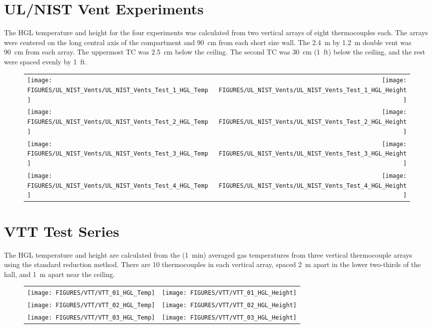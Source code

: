 \clearpage

\section{UL/NIST Vent Experiments}

The HGL temperature and height for the four experiments was calculated from two vertical arrays of eight thermocouples each. The arrays were centered on the long central axis of the compartment and 90~cm from each short size wall. The 2.4~m by 1.2~m double vent was 90~cm from each array. The uppermost TC was 2.5~cm below the ceiling. The second TC was 30~cm (1~ft) below the ceiling, and the rest were spaced evenly by 1~ft. 

\newpage

\begin{figure}[p]
\begin{tabular*}{\textwidth}{l@{\extracolsep{\fill}}r}
\texttt{[image: FIGURES/UL\_NIST\_Vents/UL\_NIST\_Vents\_Test\_1\_HGL\_Temp]} &
\texttt{[image: FIGURES/UL\_NIST\_Vents/UL\_NIST\_Vents\_Test\_1\_HGL\_Height]} \\
\texttt{[image: FIGURES/UL\_NIST\_Vents/UL\_NIST\_Vents\_Test\_2\_HGL\_Temp]} &
\texttt{[image: FIGURES/UL\_NIST\_Vents/UL\_NIST\_Vents\_Test\_2\_HGL\_Height]} \\
\texttt{[image: FIGURES/UL\_NIST\_Vents/UL\_NIST\_Vents\_Test\_3\_HGL\_Temp]} &
\texttt{[image: FIGURES/UL\_NIST\_Vents/UL\_NIST\_Vents\_Test\_3\_HGL\_Height]} \\
\texttt{[image: FIGURES/UL\_NIST\_Vents/UL\_NIST\_Vents\_Test\_4\_HGL\_Temp]} &
\texttt{[image: FIGURES/UL\_NIST\_Vents/UL\_NIST\_Vents\_Test\_4\_HGL\_Height]} 
\end{tabular*}
\end{figure}

\clearpage

\section{VTT Test Series}

The HGL temperature and height are calculated from the (1~min) averaged gas temperatures from three vertical thermocouple arrays using the standard reduction method. There are 10 thermocouples in each vertical array, spaced 2~m apart in the lower two-thirds of the hall, and 1~m apart near the ceiling.

\begin{figure}[h!]
\begin{tabular*}{\textwidth}{l@{\extracolsep{\fill}}r}
\texttt{[image: FIGURES/VTT/VTT\_01\_HGL\_Temp]} &
\texttt{[image: FIGURES/VTT/VTT\_01\_HGL\_Height]} \\
\texttt{[image: FIGURES/VTT/VTT\_02\_HGL\_Temp]} &
\texttt{[image: FIGURES/VTT/VTT\_02\_HGL\_Height]} \\
\texttt{[image: FIGURES/VTT/VTT\_03\_HGL\_Temp]} &
\texttt{[image: FIGURES/VTT/VTT\_03\_HGL\_Height]}
\end{tabular*}
\end{figure}



